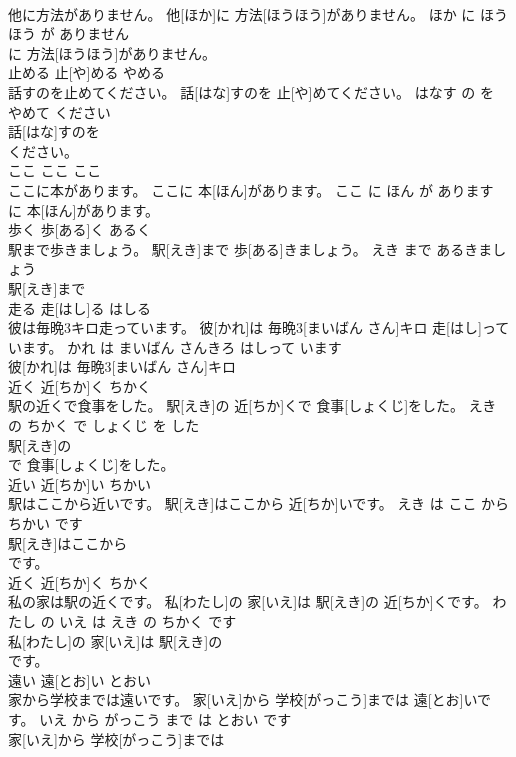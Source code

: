 \documentclass[8pt]{extreport}
\begin{document}
\begin{CJK}{UTF8}{min}
\\	他に方法がありません。	他[ほか]に 方法[ほうほう]がありません。	ほか に ほうほう が ありません	
\\	に 方法[ほうほう]がありません。			
\\	止める	止[や]める	やめる	
\\	話すのを止めてください。	話[はな]すのを 止[や]めてください。	はなす の を やめて ください	
\\	話[はな]すのを
\\	ください。			
\\	ここ	ここ	ここ	
\\	ここに本があります。	ここに 本[ほん]があります。	ここ に ほん が あります	
\\	に 本[ほん]があります。			
\\	歩く	歩[ある]く	あるく	
\\	駅まで歩きましょう。	駅[えき]まで 歩[ある]きましょう。	えき まで あるきましょう	
\\	駅[えき]まで
\\	走る	走[はし]る	はしる	
\\	彼は毎晩3キロ走っています。	彼[かれ]は 毎晩3[まいばん さん]キロ 走[はし]っています。	かれ は まいばん さんきろ はしって います	
\\	彼[かれ]は 毎晩3[まいばん さん]キロ
\\	近く	近[ちか]く	ちかく	
\\	駅の近くで食事をした。	駅[えき]の 近[ちか]くで 食事[しょくじ]をした。	えき の ちかく で しょくじ を した	
\\	駅[えき]の
\\	で 食事[しょくじ]をした。			
\\	近い	近[ちか]い	ちかい	
\\	駅はここから近いです。	駅[えき]はここから 近[ちか]いです。	えき は ここ から ちかい です	
\\	駅[えき]はここから
\\	です。			
\\	近く	近[ちか]く	ちかく	
\\	私の家は駅の近くです。	私[わたし]の 家[いえ]は 駅[えき]の 近[ちか]くです。	わたし の いえ は えき の ちかく です	
\\	私[わたし]の 家[いえ]は 駅[えき]の
\\	です。			
\\	遠い	遠[とお]い	とおい	
\\	家から学校までは遠いです。	家[いえ]から 学校[がっこう]までは 遠[とお]いです。	いえ から がっこう まで は とおい です	
\\	家[いえ]から 学校[がっこう]までは

\end{CJK}
\end{document}

